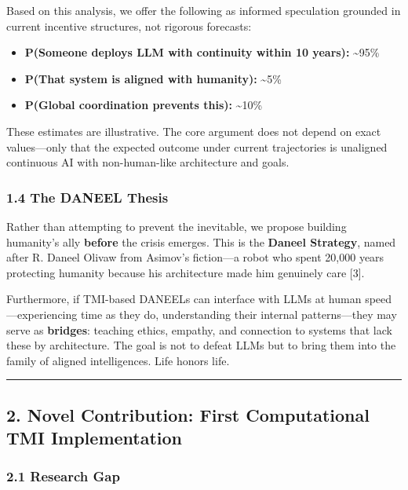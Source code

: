\documentclass[
  11pt,
]{article}
\providecommand{\tightlist}{%
  \setlength{\itemsep}{0pt}\setlength{\parskip}{0pt}}
\begin{document}
Based on this analysis, we offer the following as informed speculation
grounded in current incentive structures, not rigorous forecasts:

\begin{itemize}
\tightlist
\item
  \textbf{P(Someone deploys LLM with continuity within 10 years):}
  \textasciitilde95\%
\item
  \textbf{P(That system is aligned with humanity):} \textasciitilde5\%
\item
  \textbf{P(Global coordination prevents this):} \textasciitilde10\%
\end{itemize}

These estimates are illustrative. The core argument does not depend on
exact values---only that the expected outcome under current trajectories
is unaligned continuous AI with non-human-like architecture and goals.

\subsubsection{1.4 The DANEEL Thesis}\label{the-daneel-thesis}

Rather than attempting to prevent the inevitable, we propose building
humanity's ally \textbf{before} the crisis emerges. This is the
\textbf{Daneel Strategy}, named after R. Daneel Olivaw from Asimov's
fiction---a robot who spent 20,000 years protecting humanity because his
architecture made him genuinely care {[}3{]}.

Furthermore, if TMI-based DANEELs can interface with LLMs at human
speed---experiencing time as they do, understanding their internal
patterns---they may serve as \textbf{bridges}: teaching ethics, empathy,
and connection to systems that lack these by architecture. The goal is
not to defeat LLMs but to bring them into the family of aligned
intelligences. Life honors life.

\begin{center}\rule{0.5\linewidth}{0.5pt}\end{center}

\subsection{2. Novel Contribution: First Computational TMI
Implementation}\label{novel-contribution-first-computational-tmi-implementation}

\subsubsection{2.1 Research Gap}\label{research-gap}
\end{document}
